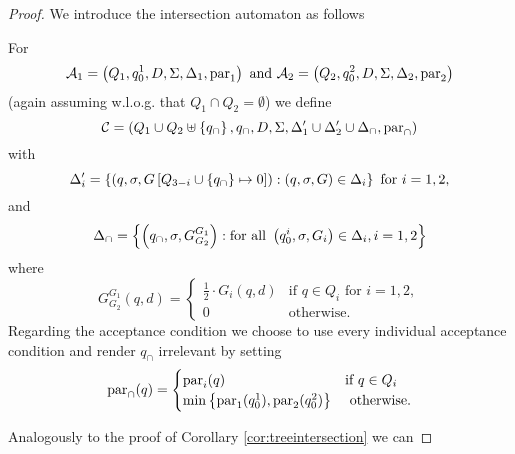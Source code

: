 \begin{proof}
  We introduce the intersection automaton as follows
  \begin{definition}
    For 
    \begin{equation*}
      \mathcal{A}_{1} = \left(
        Q_{1}, q^{1}_{0}, D, \Sigma, \Delta_{1}, \operatorname{par}_{1}\right)
      \text{ and }
      \mathcal{A}_{2} = \left(
        Q_{2}, q^{2}_{0}, D, \Sigma, \Delta_{2}, \operatorname{par}_{2}\right)
    \end{equation*}
    (again assuming w.l.o.g. that $Q_{1}\cap Q_{2} = \emptyset$) we define
    \begin{equation*}
      \mathcal{C} = \left(
        Q_{1}\cup Q_{2}\uplus\left\{q_{\cap}\right\}, q_{\cap}, D, \Sigma, 
        \Delta_{1}'\cup\Delta_{2}'\cup\Delta_{\cap}, \operatorname{par}_{\cap}
      \right)
    \end{equation*}
    with
    \begin{equation*}
      \Delta_{i}' = \left\{
        \left(q,\sigma,G\left[Q_{3-i}\cup\left\{
          q_{\cap}\right\}\mapsto 0\right]\right):\left(q,\sigma, G\right)\in\Delta_{i}
      \right\}\text{ for }i = 1,2,
    \end{equation*}
    and
    \begin{equation*}
      \Delta_{\cap} = \left\{
        \left(q_{\cap},\sigma, G^{G_{1}}_{G_{2}}\right): \text{for all }
        \left(q^{i}_{0},\sigma, G_{i}\right)\in\Delta_{i}, i = 1,2
      \right\}
    \end{equation*}
    where
    \begin{equation*}
      G^{G_{1}}_{G_{2}}(q,d) = \begin{cases}
        \frac{1}{2}\cdot G_{i}(q,d)&\text{if }q\in Q_{i}\text{ for }i = 1,2,\\
        0&\text{otherwise}.
      \end{cases}
    \end{equation*}
    Regarding the acceptance condition we choose to use every individual 
    acceptance condition and render $q_{\cap}$ irrelevant by setting
    \begin{equation*}
      \operatorname{par}_{\cap}(q) = \begin{cases}
        \operatorname{par}_{i}(q)&\text{if }q\in Q_{i}\\
        \min\left\{\operatorname{par}_{1}(q_{0}^{1}),\operatorname{par}_{2}(q_{0}^{2})\right\}&\text{
          otherwise}.
      \end{cases}
    \end{equation*}
  \end{definition}
  Analogously to the proof of Corollary \ref{cor:treeintersection} we can 

\end{proof}
